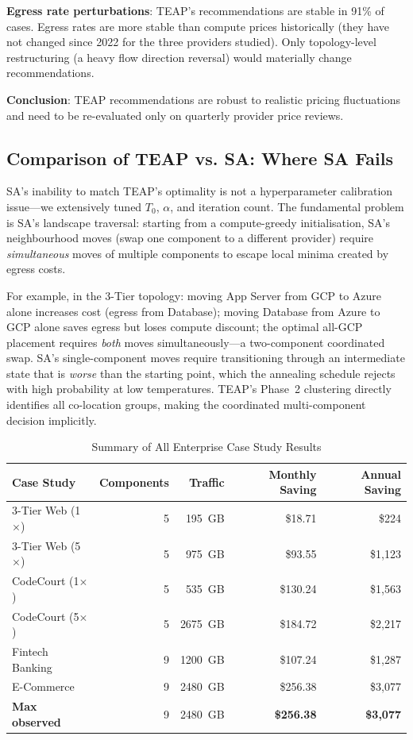 \documentclass[sigconf,10pt]{acmart}
\begin{document}
\textbf{Egress rate perturbations}: TEAP's recommendations are stable in 91\%
of cases.
Egress rates are more stable than compute prices historically (they have not
changed since 2022 for the three providers studied).
Only topology-level restructuring (a heavy flow direction reversal) would
materially change recommendations.

\textbf{Conclusion}: TEAP recommendations are robust to realistic pricing
fluctuations and need to be re-evaluated only on quarterly provider price reviews.

\subsection{Comparison of TEAP vs. SA: Where SA Fails}

SA's inability to match TEAP's optimality is not a hyperparameter calibration
issue---we extensively tuned $T_0$, $\alpha$, and iteration count.
The fundamental problem is SA's landscape traversal: starting from a compute-greedy
initialisation, SA's neighbourhood moves (swap one component to a different provider)
require \emph{simultaneous} moves of multiple components to escape local minima
created by egress costs.

For example, in the 3-Tier topology: moving App Server from GCP to Azure alone
increases cost (egress from Database); moving Database from Azure to GCP alone
saves egress but loses compute discount; the optimal all-GCP placement requires
\emph{both} moves simultaneously---a two-component coordinated swap.
SA's single-component moves require transitioning through an intermediate state
that is \emph{worse} than the starting point, which the annealing schedule
rejects with high probability at low temperatures.
TEAP's Phase~2 clustering directly identifies all co-location groups, making the
coordinated multi-component decision implicitly.

\begin{table}[h]
\centering\caption{Summary of All Enterprise Case Study Results}\label{tab:enterprise_summary}
\footnotesize\setlength{\tabcolsep}{4pt}
\begin{tabular}{lrrrr}
\toprule
Case Study & Components & Traffic & Monthly Saving & Annual Saving\\
\midrule
3-Tier Web (1$\times$)   & 5 & 195~GB  & \$18.71  & \$224\\
3-Tier Web (5$\times$)   & 5 & 975~GB  & \$93.55  & \$1,123\\
CodeCourt (1$\times$)    & 5 & 535~GB  & \$130.24 & \$1,563\\
CodeCourt (5$\times$)    & 5 & 2675~GB & \$184.72 & \$2,217\\
Fintech Banking          & 9 & 1200~GB & \$107.24 & \$1,287\\
E-Commerce               & 9 & 2480~GB & \$256.38 & \$3,077\\
\midrule
\textbf{Max observed}    & 9 & 2480~GB & \textbf{\$256.38} & \textbf{\$3,077}\\
\bottomrule
\end{tabular}
\end{table}
\end{document}
